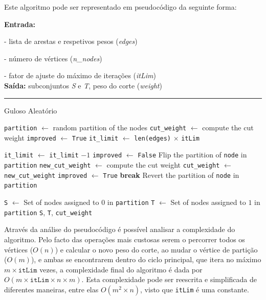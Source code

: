 \documentclass[mirror, portugues]{revdetua}
\begin{document}
Este algoritmo pode ser representado em pseudocódigo da seguinte forma:

\begin{algorithm}[H]
\raggedright
\textbf{Entrada:}

- lista de arestas e respetivos pesos (\textit{edges})

- número de vértices (\textit{n\_nodes})

- fator de ajuste do máximo de iterações (\textit{itLim})\\
\textbf{Saída:} subconjuntos \textit{S} e \textit{T}, peso do corte (\textit{weight}) \\
\hrule 
\caption{Guloso Aleatório}
\begin{algorithmic}[1]
    \State \texttt{partition} $\gets$ random partition of the nodes
    \State \texttt{cut\_weight} $\gets$ compute the cut weight
    \State \texttt{improved} $\gets$ \texttt{True}
    \State \texttt{it\_limit} $\gets$ \texttt{len(edges)} \ensuremath{\times} \texttt{itLim}

        \State \texttt{it\_limit} $\gets$ \texttt{it\_limit} $ - 1$
        \State \texttt{improved} $\gets$ \texttt{False}
            \State Flip the partition of \texttt{node} in \texttt{partition}
            \State \texttt{new\_cut\_weight} $\gets$ compute the cut weight
                \State \texttt{cut\_weight} $\gets$ \texttt{new\_cut\_weight}
                \State \texttt{improved} $\gets$ \texttt{True}
                \State \textbf{break}  
            \EndIf
            \State Revert the partition of \texttt{node} in \texttt{partition}
        \EndFor
    \EndWhile

    \State \texttt{S} $\gets$ Set of nodes assigned to $0$ in \texttt{partition}
    \State \texttt{T} $\gets$ Set of nodes assigned to $1$ in \texttt{partition}
    \Return \texttt{S}, \texttt{T}, \texttt{cut\_weight}
\end{algorithmic}
\end{algorithm}

Através da análise do pseudocódigo é possível analisar a complexidade do algoritmo. Pelo facto das operações mais custosas serem o percorrer todos os vértices ($O(n)$) e calcular o novo peso do corte, ao mudar o vértice de partição ($O(m)$), e ambas se encontrarem dentro do ciclo principal, que itera no máximo $m \times \texttt{itLim}$ vezes, a complexidade final do algoritmo é dada por $O(m \times \texttt{itLim} \times n \times m)$. Esta complexidade pode ser reescrita e simplificada de diferentes maneiras, entre elas $O(m^2 \times n)$, visto que \texttt{itLim} é uma constante.
\end{document}
